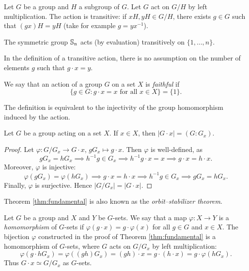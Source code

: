 \begin{example}
    Let $G$ be a group and $H$ a subgroup of $G$. Let $G$ act
    on $G/H$ by left multiplication. The action is transitive: if 
    $xH,yH\in G/H$, there exists $g\in G$ such that
    $(gx)H=yH$ (take for example $g=yx^{-1}$). 
\end{example}

\begin{example}
The symmetric group $\mathbb{S}_n$ acts (by evaluation) transitively 
on $\{1,\dots,n\}$.
\end{example}

In the definition of a transitive action, there is no assumption
on the number of elements $g$ such that $g\cdot x=y$.

\begin{definition}
We say that an action of a group $G$ on a set 
$X$ is \emph{faithful} if 
\[
\{g\in G:g\cdot x=x\text{ for all $x\in X$}\}=\{1\}.
\]
\end{definition}

The definition is equivalent to the injectivity of 
the group homomorphism induced
by the action. 

\begin{theorem}
\label{thm:fundamental}
Let $G$ be a group acting on a set $X$. If 
$x\in X$, then $|G\cdot x|=(G:G_x)$.
\end{theorem}

\begin{proof}
    Let $\varphi\colon G/G_x\to G\cdot x$, $gG_x\mapsto g\cdot x$. Then $\varphi$ is well-defined, as 
        \[
        gG_x=hG_x\implies h^{-1}g\in G_x
        \implies h^{-1}g\cdot x=x\implies g\cdot x=h\cdot x.
        \]
    Moreover, $\varphi$ is injective: 
        \[
        \varphi(gG_x)=\varphi(hG_x)\implies
        g\cdot x=h\cdot x\implies
        h^{-1}g\in G_x\implies gG_x=hG_x.
        \]
    Finally, $\varphi$ is surjective. Hence 
    $|G/G_x|=|G\cdot x|$.
\end{proof}

Theorem \ref{thm:fundamental} is also known 
as the \emph{orbit--stabilizer theorem}. 

\begin{optional}
Let $G$ be a group and $X$ and $Y$ be $G$-sets. 
We say that a map $\varphi\colon X\to Y$ is a 
\emph{homomorphism} of $G$-sets if $\varphi(g\cdot x)=g\cdot \varphi(x)$ for all $g\in G$ and $x\in X$. The bijection 
$\varphi$ constructed in the proof of Theorem \ref{thm:fundamental}
is a homomorphism of $G$-sets, where
$G$ acts on $G/G_x$ by left multiplication: 
\[
\varphi(g\cdot hG_x)=\varphi((gh)G_x)=(gh)\cdot x=g\cdot (h\cdot x)=g\cdot\varphi(hG_x).
\]
Thus $G\cdot x\simeq G/G_x$ as $G$-sets.
\end{optional}

